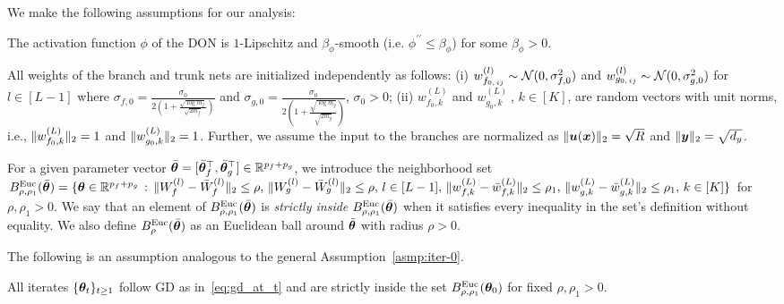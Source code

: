 We make the following assumptions for our analysis: 
\begin{asmp}
\label{asmp:Activation_Function}
The activation function $\phi$ of the DON is $1$-Lipschitz and $\beta_{\phi}$-smooth (i.e. $\phi^{\prime\prime}\leq \beta_{\phi}$) for some $\beta_{\phi} > 0$.
\end{asmp}
\begin{asmp}
\label{asmp:smoothinit}
All weights of the branch and trunk nets are initialized independently as follows: (i) $w^{(l)}_{f_{0,\,ij}}\sim {\mathcal{N}} (0, \sigma^2_{f,0})$ and $w^{(l)}_{g_{0,\,ij}}\sim {\mathcal{N}} (0, \sigma^2_{g,0})$ for $l\in [L-1]$ where {$\sigma_{f,0} = \frac{\sigma_0}{2(1+\frac{\sqrt{\log m_f}}{\sqrt{2m_f}})}$ and $\sigma_{g,0} = \frac{\sigma_0}{2(1+\frac{\sqrt{\log m_g}}{\sqrt{2m_g}})}$}, $\sigma_0>0$; (ii) $w^{(L)}_{f_{0},k}$ and $w^{(L)}_{g_{0},k}~$, $k\in[K]$, are random vectors with unit norms, i.e., $\lVert w^{(L)}_{f_{0},k}\rVert_2=1$ and $\lVert w^{(L)}_{g_{0},k}\rVert_2=1$. Further, we assume the input to the branches are normalized as $\lVert{\bm{u}}({\bm{x}})\rVert_2=\sqrt{R}$ and $\lVert{\bm{y}}\rVert_2=\sqrt{d_y}$.
\end{asmp}

For a given parameter vector $\bar{{\bm{\theta}}}=[\bar{{\bm{\theta}}}_f^\top,\bar{{\bm{\theta}}}_g^\top]\in{\mathbb{R}}^{p_f+p_g}$, we introduce the neighborhood set  
$B^{\mathrm{Euc}}_{\rho,\rho_1}(\bar{{\bm{\theta}}})=\{{\bm{\theta}}\in\mathbb{R}^{p_f+p_g}\,:\,\lVert W^{(l)}_f-\bar{W}^{(l)}_f\rVert_2\leq \rho,\,\lVert W^{(l)}_g-\bar{W}^{(l)}_g \rVert_2\leq \rho,\,l\in[L-1],\,\lVert w^{(L)}_{f,k}-\bar{w}^{(L)}_{f,k}\rVert_2\leq\rho_1,\,\lVert w^{(L)}_{g,k}-\bar{w}^{(L)}_{g,k}\rVert_2\leq\rho_1,\,k\in[K]\}$ for $\rho,\rho_1>0$. 
%
We say that an element of $B^{\mathrm{Euc}}_{\rho,\rho_1}(\bar{{\bm{\theta}}})$ is \emph{strictly inside} $B^{\mathrm{Euc}}_{\rho,\rho_1}(\bar{{\bm{\theta}}})$ when it satisfies every inequality in the set's definition without equality.
%
We also define $B^{\mathrm{Euc}}_{\rho}(\bar{{\bm{\theta}}})$ as an Euclidean ball around $\bar{{\bm{\theta}}}$ with radius $\rho>0$.

The following is an assumption analogous to the general Assumption~\ref{asmp:iter-0}.

\begin{asmp}
\label{asmp:iter-1}
All iterates $\{{\bm{\theta}}_t\}_{t\geq 1}$ follow GD as in~\eqref{eq:gd_at_t} and are strictly inside the set $B^{\mathrm{Euc}}_{\rho,\rho_1}({\bm{\theta}}_0)$ for fixed $\rho,\rho_1>0$.
\end{asmp}

